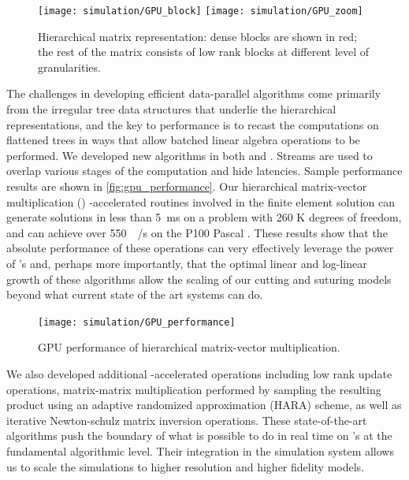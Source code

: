 \begin{figure}
  \centering%
	\texttt{[image: simulation/GPU\_block]}\vspace{2ex}
	\texttt{[image: simulation/GPU\_zoom]}\\
	\caption{Hierarchical matrix representation: dense blocks are shown in red; the rest of the matrix consists of low rank blocks at different level of granularities.}\label{fig:gpu_matrix}
\end{figure}


The challenges in developing efficient data-parallel  algorithms come primarily from the irregular tree data structures that underlie the hierarchical representations, and the key to performance is to recast the computations on flattened trees in ways that allow batched linear algebra operations to be performed. We developed new  algorithms in both  and . Streams are used to overlap various stages of the computation and hide latencies. Sample performance results are shown in \autoref{fig:gpu_performance}. Our hierarchical matrix-vector multiplication 
() -accelerated routines involved in the finite element solution can generate solutions in less than \SI{5}{\milli\second} on a problem with 260 K degrees of freedom, and can achieve over \SI{550}{\giga\byte/\second} on the P100 Pascal . These results show that the absolute performance of these operations can very effectively leverage the power of 's and, perhaps more importantly, that the optimal linear and log-linear growth of these algorithms allow the scaling of our cutting and suturing models beyond what current state of the art systems can do.  

\begin{figure}
  \centering%
	\texttt{[image: simulation/GPU\_performance]}
	\caption{GPU performance of hierarchical matrix-vector multiplication.}\label{fig:gpu_performance}
\end{figure}

We also developed additional -accelerated operations including low rank update operations, matrix-matrix multiplication performed by sampling the resulting product using an adaptive randomized approximation (HARA) scheme,  as well as iterative Newton-schulz matrix inversion operations.  These state-of-the-art algorithms push the boundary of what is possible to do in real time on 's at the fundamental algorithmic level. Their integration in the simulation system allows us to scale the simulations to higher resolution and higher fidelity models. 

